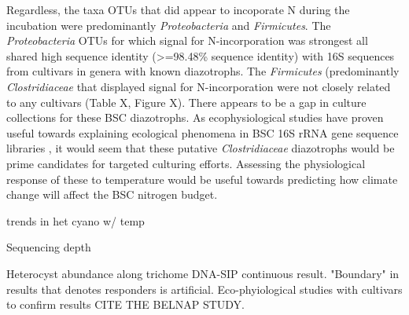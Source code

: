 Regardless, the taxa OTUs that did appear to incoporate N during the incubation were predominantly \textit{Proteobacteria} and \textit{Firmicutes}. The \textit{Proteobacteria} OTUs for which signal for N-incorporation was strongest all shared high sequence identity (\textgreater=98.48\% sequence identity) with 16S sequences from cultivars in genera with known diazotrophs. The \textit{Firmicutes} (predominantly \textit{Clostridiaceae} that displayed signal for N-incorporation were not closely related to any cultivars (Table X, Figure X). There appears to be a gap in culture collections for these BSC diazotrophs. As ecophysiological studies have proven useful towards explaining ecological phenomena in BSC 16S rRNA gene sequence libraries \cite{Garcia_Pichel_2013}, it would seem that these putative \textit{Clostridiaceae} diazotrophs would be prime candidates for targeted culturing efforts. Assessing the physiological response of these  to temperature would be useful towards predicting how climate change will affect the BSC nitrogen budget.   

\cite{Yeager_2012} trends in het cyano w/ temp

Sequencing depth

Heterocyst abundance along trichome
DNA-SIP continuous result. "Boundary" in results that denotes responders is artificial. Eco-phyiological studies with cultivars to confirm results CITE THE BELNAP STUDY.

